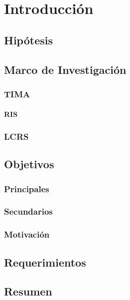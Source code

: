 \chapter{Introducción}\label{marco del trabajo}
    
    
    \section{Hipótesis}
    

    \section{Marco de Investigación}
    
        \subsection{TIMA}
        
            \subsubsection{RIS}
            
        \subsection{LCRS}
        

\section{Objetivos}

    \subsection{Principales}
    
    \subsection{Secundarios}
    
    \subsection{Motivación}
    

\section{Requerimientos}


\section{Resumen}
